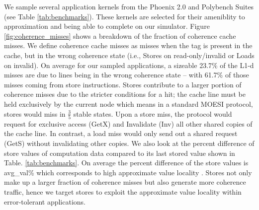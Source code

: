 We sample several application kernels from the Phoenix 2.0 \cite{phoenix} and Polybench Suites \cite{polybench} (see Table \ref{tab:benchmarks}). These kernels are selected for their ameniblity to approximation and being able to complete on our simulator. Figure \ref{fig:coherence_misses} shows a breakdown of the fraction of coherence cache misses. We define coherence cache misses as misses when the tag is present in the cache, but in the wrong coherence state (i.e., Stores on read-only/invalid or Loads on invalid). On average for our sampled applications, a sizeable 23.7\% of the L1-d misses are due to lines being in the wrong coherence state -- with 61.7\% of those misses coming from store instructions. Stores contribute to a larger portion of coherence misses due to the stricter conditions for a hit; the cache line must be held exclusively by the current node which means in a standard MOESI protocol, stores would miss in $\frac{3}{5}$ stable states. Upon a store miss, the protocol would request for exclusive access (GetX) and Invalidate (Inv) all other shared copies of the cache line. In contrast, a load miss would only send out a shared request (GetS) without invalidating other copies. We also look at the percent difference of store values of computation data compared to its last stored value shown in Table. \ref{tab:benchmarks}. On average the percent difference of the store values is avg\_val\% which corresponds to high approximate value locality \cite{lva}. Stores not only make up a larger fraction of coherence misses but also generate more coherence traffic, hence we target stores to exploit the approximate value locality within error-tolerant applications.

